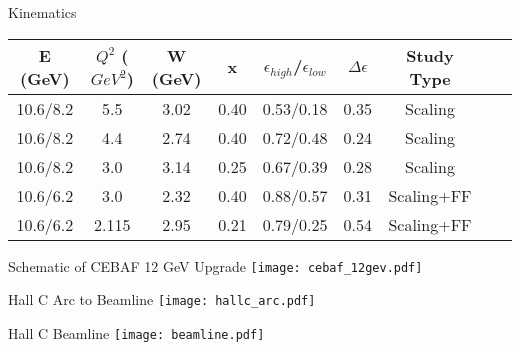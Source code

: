 \begin{Mtable}{Kinematics}
  \centering
  \begin{tabular}{|c|c|c|c|c|c|c|c|c|}
    \hline
    \textbf{E (GeV)} & \textbf{$Q^2$ ($GeV^2$)} & \textbf{W (GeV)} & \textbf{x} & \textbf{$\epsilon_{high}$/$\epsilon_{low}$} & \textbf{$\Delta\epsilon$} & \textbf{Study Type}\\
    \hline
    10.6/8.2 & 5.5 & 3.02 & 0.40 & 0.53/0.18 & 0.35 & Scaling \\
    10.6/8.2 & 4.4 & 2.74 & 0.40 & 0.72/0.48 & 0.24 & Scaling \\
    10.6/8.2 & 3.0 & 3.14 & 0.25 & 0.67/0.39 & 0.28 & Scaling \\
    10.6/6.2 & 3.0 & 2.32 & 0.40 & 0.88/0.57 & 0.31 & Scaling+FF \\
    10.6/6.2 & 2.115 & 2.95 & 0.21 & 0.79/0.25 & 0.54 & Scaling+FF \\
    \hline
    \end{tabular}
  \caption{Summary of all kinematics for the KaonLT 2018-19 experiment.}
  \label{tab:1-1_kinematics}
\end{Mtable}

%
%

\begin{Mfigure}{Schematic of CEBAF 12 GeV Upgrade}
  \centering
  \texttt{[image: cebaf\_12gev.pdf]}
  \caption{Schematic of CEBAF 12 GeV Upgrade.}
  \label{fig:2-1_cebaf12gev}
\end{Mfigure}

%
%

\begin{Mfigure}{Hall C Arc to Beamline}
  \centering
  \texttt{[image: hallc\_arc.pdf]}
  \caption{The Hall C arc which steers the beam to the beamline. Electron synchrotron radiation loss is shown with the yellow arrows.}
  \label{fig:2-2_hallc_arc}
\end{Mfigure}

\begin{Mfigure}{Hall C Beamline}
  \centering
  \texttt{[image: beamline.pdf]}
  \caption{Hall C beamline from entrance of hall to the target scattering chamber.}
  \label{fig:2-2_beamline}
\end{Mfigure}

